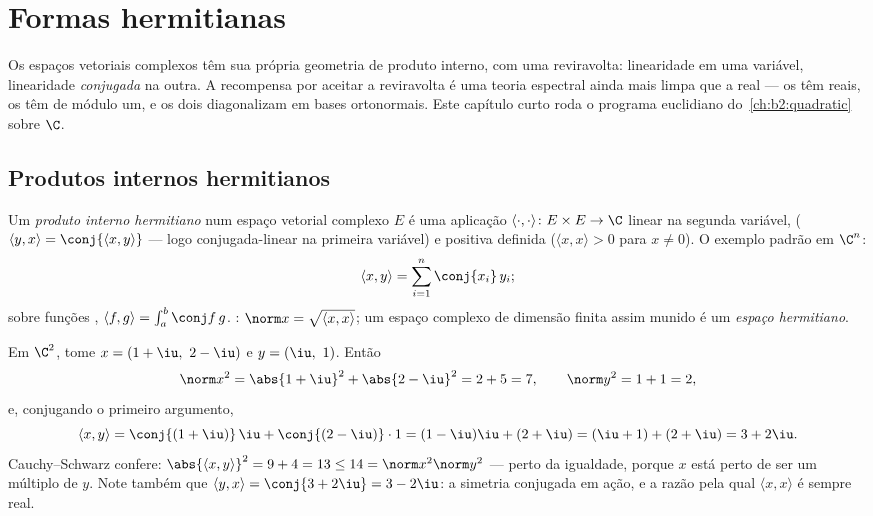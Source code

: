 \chapter{Formas hermitianas}\label{ch:b2:hermitian}

Os espaços vetoriais complexos têm sua própria geometria de produto interno, com
uma reviravolta: linearidade em uma variável, linearidade \emph{conjugada} na
outra. A recompensa por aceitar a reviravolta é uma teoria espectral
ainda mais limpa que a real --- os  têm
 reais, os  têm  de módulo um, e os dois
diagonalizam em bases ortonormais. Este capítulo curto roda o
programa euclidiano do~\cref{ch:b2:quadratic} sobre $\C$.

\section{Produtos internos hermitianos}

\begin{definition}\label{def:b2:hermitian:def}
Um \emph{produto interno hermitiano} num
espaço vetorial complexo $E$ é uma aplicação $\langle\cdot,\cdot\rangle
\colon E \times E \to \C$ linear na segunda variável,
 ($\langle y, x\rangle = \conj{\langle x,
y\rangle}$ --- logo conjugada-linear na primeira variável) e
positiva definida ($\langle x, x\rangle > 0$ para $x \neq 0$). O
exemplo padrão em $\C^n$:
\[
\langle x, y \rangle = \sum_{i=1}^{n} \conj{x_i}\, y_i ;
\]
sobre funções , $\langle f, g\rangle = \int_a^b \conj
f\,g$. : $\norm x = \sqrt{\langle x,x\rangle}$; um
espaço complexo de dimensão finita assim munido é um \emph{espaço
hermitiano}.
\end{definition}

\begin{example}\label{ex:b2:hermitian:firstcomp}
Em $\C^2$, tome $x = (1+\iu,\ 2-\iu)$ e $y = (\iu,\ 1)$.
Então
\[
\norm x^2 = \abs{1+\iu}^2 + \abs{2-\iu}^2 = 2 + 5 = 7,
\qquad
\norm y^2 = 1 + 1 = 2,
\]
e, conjugando o primeiro argumento,
\[
\langle x, y\rangle
= \conj{(1+\iu)}\,\iu + \conj{(2-\iu)}\cdot1
= (1-\iu)\iu + (2+\iu)
= (\iu + 1) + (2 + \iu) = 3 + 2\iu .
\]
Cauchy--Schwarz confere: $\abs{\langle x, y\rangle}^2 = 9 +
4 = 13 \leq 14 = \norm x^2\norm y^2$ --- perto da igualdade,
porque $x$ está perto de ser um múltiplo de $y$. Note também que
$\langle y, x\rangle = \conj{3 + 2\iu} = 3 - 2\iu$:
a simetria conjugada em ação, e a razão pela qual $\langle x,
x\rangle$ é sempre real.
\end{example}

